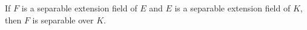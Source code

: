 If $F$ is a separable extension field of $E$ and $E$ is a separable extension field of $K$, then $F$ is separable over $K$.
